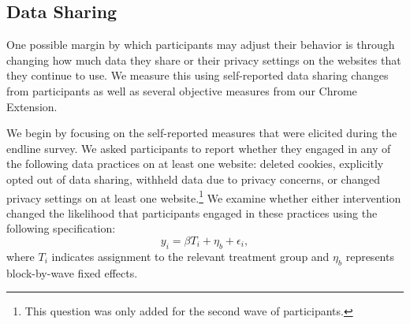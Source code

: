 \documentclass[12pt]{article}
\theoremstyle{definition}
\theoremstyle{remark}
\begin{document}
\begin{appendix}
\subsection{Data Sharing}\label{sec:app-data-sharing}
\begin{table}[H]
\caption{Treatment Effect on Self-Reported Data Sharing Behavior}\label{tab:treatment_effect_data_sharing}
\scalebox{0.8}{

}
\caption*{\scriptsize \textsc{Notes}: This table reports OLS estimates from Equation~\eqref{eq:data_sharing_ols} on self-reported changes in data sharing behavior from the endline survey. Column~(1) measures whether a participant self-reports deleting cookies on at least one website or at least once during the intervention period. Column~(2) measures whether a participant self-reports explicitly opting out of data sharing with at least one website. Column~(3) measures whether a participant self-reports deciding not to share data with at least one website. Column~(4) measures whether a participant self-reports changing privacy settings for at least one website. Column~(5) measures whether a participant self-reports at least one of the four behaviors in columns~(1)--(4). The data is only available for participants who went through the second wave of the study.}
\end{table}

One possible margin by which participants may adjust their behavior is through changing how much data they share or their privacy settings on the websites that they continue to use. We measure this using self-reported data sharing changes from participants as well as several objective measures from our Chrome Extension.

We begin by focusing on the self-reported measures that were elicited during the endline survey. We asked participants to report whether they engaged in any of the following data practices on at least one website: deleted cookies, explicitly opted out of data sharing, withheld data due to privacy concerns, or changed privacy settings on at least one website.\footnote{This question was only added for the second wave of participants.} We examine whether either intervention changed the likelihood that participants engaged in these practices using the following specification:
\begin{equation}\label{eq:data_sharing_ols}
y_i = \beta T_i + \eta_b + \epsilon_i,
\end{equation}
where $T_i$ indicates assignment to the relevant treatment group and $\eta_b$ represents block-by-wave fixed effects.


\end{appendix}
\end{document}
